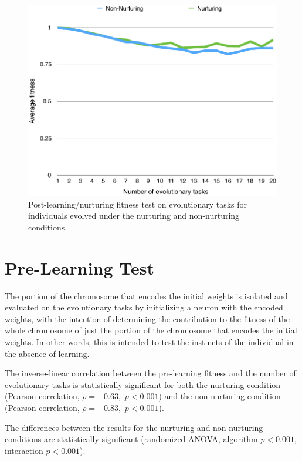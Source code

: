 \documentclass[master]{outhesis}
\begin{document}
\begin{figure}[H]
	\centering
	\includegraphics{NurturingFitnessTestPlot.pdf}
	\caption{Post-learning/nurturing fitness test on evolutionary tasks for individuals evolved under the nurturing and non-nurturing conditions.}
\end{figure}

\section{Pre-Learning Test}

The portion of the chromosome that encodes the initial weights is isolated and evaluated on the evolutionary tasks by initializing a neuron with the encoded weights, 
with the intention of determining the contribution to the fitness of the whole chromosome of just the portion of the chromosome that encodes the initial weights.
In other words, this is intended to test the instincts of the individual in the absence of learning.

The inverse-linear correlation between the pre-learning fitness and the number of evolutionary tasks is statistically significant for both 
the nurturing condition (Pearson correlation, $\rho=-0.63,$ $p < 0.001$)
and the non-nurturing condition (Pearson correlation, $\rho=-0.83,$ $p < 0.001$).

The differences between the results for the nurturing and non-nurturing conditions are statistically significant (randomized ANOVA, algorithm $p < 0.001$, interaction $p < 0.001$).
\end{document}
